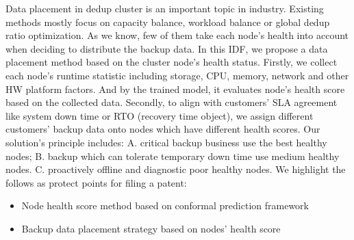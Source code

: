 \documentclass{article}
\begin{document}
Data placement in dedup cluster is an important topic in industry. Existing methods mostly focus on capacity balance, workload balance or global dedup ratio optimization. As we know, few of them take each node’s health into account when deciding to distribute the backup data. In this IDF, we propose a data placement method based on the cluster node’s health status. Firstly, we collect each node’s runtime statistic including storage, CPU, memory, network and other HW platform factors. And by the trained model, it evaluates node’s health score based on the collected data. Secondly, to align with customers’ SLA agreement like system down time or RTO (recovery time object), we assign different customers’ backup data onto nodes which have different health scores.  Our solution’s principle includes: A. critical backup business use the best healthy nodes; B. backup which can tolerate temporary down time use medium healthy nodes. C. proactively offline and diagnostic poor healthy nodes.
We highlight the follows as protect points for filing a patent:

\begin{itemize} \itemsep 1pt
\item {Node health score method based on conformal prediction framework }  
\item {Backup data placement strategy based on nodes’ health score}  
\end{itemize}
\end{document}
